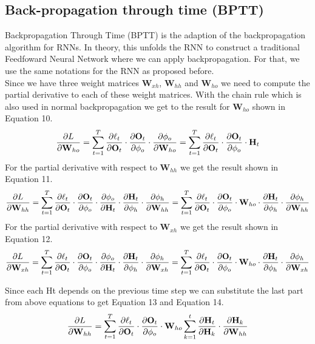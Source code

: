 \documentclass{article}
\begin{document}
\subsection{Back-propagation through time (BPTT)}
Backpropagation Through Time (BPTT) is the adaption of the backpropagation algorithm for RNNs. In theory, this unfolds the RNN to construct a traditional Feedfoward Neural Network where
we can apply backpropagation. For that, we use the same notations for the RNN as proposed before. \\


Since we have three weight matrices $\mathbf{W}_{xh}$, $\mathbf{W}_{hh}$ and $\mathbf{W}_{ho}$ we need to compute the partial derivative to each of these weight matrices. With the chain rule which is also used in normal backpropagation we get to the result for $\mathbf{W}_{ho}$ shown in Equation 10.
\begin{equation}
  \pdv{L}{\mathbf{W}_{ho}} = \sum_{t=1}^T \pdv{\ell_t}{\mathbf{O}_t} \cdot \pdv{\mathbf{O}_t}{\phi_o} \cdot \pdv{\phi_o}{\mathbf{W}_{ho}} = \sum_{t=1}^T \pdv{\ell_t}{\mathbf{O}_t} \cdot \pdv{\mathbf{O}_t}{\phi_o} \cdot \mathbf{H}_t
\end{equation}
For the partial derivative with respect to $\mathbf{W}_{hh}$ we get the result shown in Equation 11.
\begin{equation}
  \pdv{L}{\mathbf{W}_{hh}} = \sum_{t=1}^T \pdv{\ell_t}{\mathbf{O}_t} \cdot \pdv{\mathbf{O}_t}{\phi_o} \cdot \pdv{\phi_o}{\mathbf{H}_t} \cdot \pdv{\mathbf{H}_t}{\phi_h} \cdot \pdv{\phi_h}{\mathbf{W}_{hh}}
= \sum_{t=1}^T \pdv{\ell_t}{\mathbf{O}_t} \cdot \pdv{\mathbf{O}_t}{\phi_o} \cdot \mathbf{W}_{ho} \cdot \pdv{\mathbf{H}_t}{\phi_h} \cdot \pdv{\phi_h}{\mathbf{W}_{hh}}
\end{equation}
For the partial derivative with respect to $\mathbf{W}_{xh}$ we get the result shown in Equation 12.
\begin{equation}
  \pdv{L}{\mathbf{W}_{xh}} = \sum_{t=1}^T \pdv{\ell_t}{\mathbf{O}_t} \cdot \pdv{\mathbf{O}_t}{\phi_o} \cdot \pdv{\phi_o}{\mathbf{H}_t} \cdot \pdv{\mathbf{H}_t}{\phi_h} \cdot \pdv{\phi_h}{\mathbf{W}_{xh}}
  = \sum_{t=1}^T \pdv{\ell_t}{\mathbf{O}_t} \cdot \pdv{\mathbf{O}_t}{\phi_o} \cdot \mathbf{W}_{ho} \cdot \pdv{\mathbf{H}_t}{\phi_h} \cdot \pdv{\phi_h}{\mathbf{W}_{xh}}
\end{equation}

Since each Ht depends on the previous time step we can substitute the last part from above equations
to get Equation 13 and Equation 14.
\begin{equation}
  \pdv{L}{\mathbf{W}_{hh}} = \sum_{t=1}^T \pdv{\ell_t}{\mathbf{O}_t} \cdot \pdv{\mathbf{O}_t}{\phi_o} \cdot \mathbf{W}_{ho} \sum_{k=1}^t \pdv{\mathbf{H}_t}{\mathbf{H}_k} \cdot \pdv{\mathbf{H}_k}{\mathbf{W}_{hh}}
\end{equation}
\end{document}
